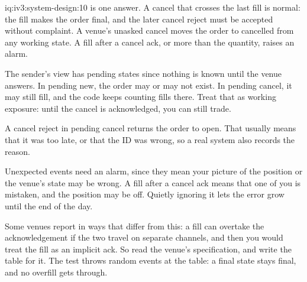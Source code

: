 \begin{solution}{iq:iv3:system-design:10}
 is one answer. A cancel that crosses the last fill is normal: the fill makes the order final, and the later cancel reject must be accepted without complaint. A venue's unasked cancel moves the order to cancelled from any working state. A fill after a cancel ack, or more than the quantity, raises an alarm.
\enlargethispage{-3\baselineskip}%
\label{lst:iv3:sd:states}

The sender's view has pending states since nothing is known until the venue answers. In pending new, the order may or may not exist. In pending cancel, it may still fill, and the code keeps counting fills there. Treat that as working exposure: until the cancel is acknowledged, you can still trade.

A cancel reject in pending cancel returns the order to open. That usually means that it was too late, or that the ID was wrong, so a real system also records the reason.

Unexpected events need an alarm, since they mean your picture of the position or the venue's state may be wrong. A fill after a cancel ack means that one of you is mistaken, and the position may be off. Quietly ignoring it lets the error grow until the end of the day.

Some venues report in ways that differ from this: a fill can overtake the acknowledgement if the two travel on separate channels, and then you would treat the fill as an implicit ack. So read the venue's specification, and write the table for it. The test throws random events at the table: a final state stays final, and no overfill gets through.

\end{solution}


